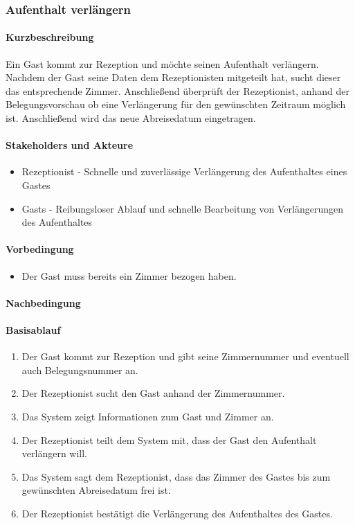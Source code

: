\subsubsection{Aufenthalt verlängern}

\paragraph{Kurzbeschreibung}
Ein \Gls{Gast} kommt zur \Gls{Rezeption} und möchte seinen Aufenthalt verlängern. Nachdem der \Gls{Gast} seine Daten dem \Gls{Rezeptionist}en mitgeteilt hat, sucht dieser das entsprechende Zimmer. Anschließend überprüft der \Gls{Rezeptionist}, anhand der \Gls{Belegungsvorschau} ob eine Verlängerung für den gewünschten Zeitraum möglich ist. Anschließend wird das neue Abreisedatum eingetragen.

\paragraph{Stakeholders und Akteure}
\begin{itemize}
\item \Gls{Rezeptionist} - Schnelle und zuverlässige Verlängerung des Aufenthaltes eines \Gls{Gast}es
\item \Glspl{Gast} - Reibungsloser Ablauf und schnelle Bearbeitung von Verlängerungen des Aufenthaltes
\end{itemize}

\paragraph{Vorbedingung}
\begin{itemize}
\item Der \Gls{Gast} muss bereits ein Zimmer bezogen haben.
\end{itemize}

\paragraph{Nachbedingung}

\paragraph{Basisablauf}
\begin{enumerate}
\item Der \Gls{Gast} kommt zur \Gls{Rezeption} und gibt seine \Gls{Zimmernummer} und eventuell auch \Gls{Belegungsnummer} an.
\item Der \Gls{Rezeptionist} sucht den Gast anhand der \Gls{Zimmernummer}.
\item Das System zeigt Informationen zum \Gls{Gast} und \Gls{Zimmer} an.
\item Der \Gls{Rezeptionist} teilt dem System mit, dass der \Gls{Gast} den Aufenthalt verlängern will.
\item Das System sagt dem \Gls{Rezeptionist}, dass das \Gls{Zimmer} des \Gls{Gast}es bis zum gewünschten Abreisedatum frei ist.
\item Der \Gls{Rezeptionist} bestätigt die Verlängerung des Aufenthaltes des \Gls{Gast}es.
\end{enumerate}

